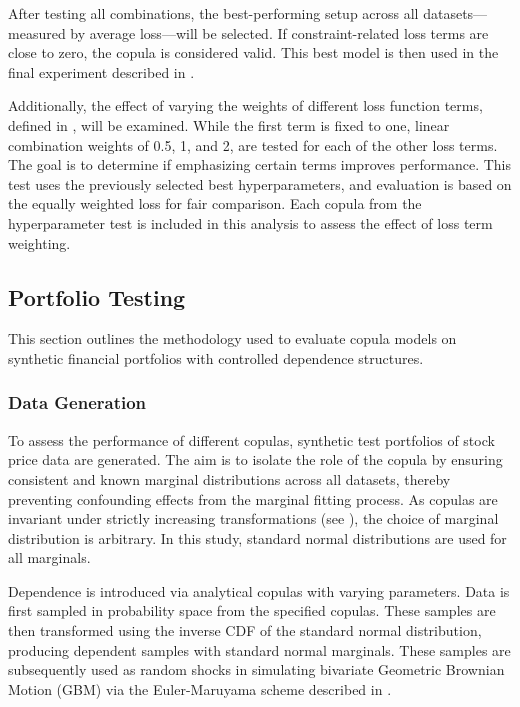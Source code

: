 
After testing all combinations, the best-performing setup across all datasets—measured by average loss—will be selected. If constraint-related loss terms are close to zero, the copula is considered valid. This best model is then used in the final experiment described in .

Additionally, the effect of varying the weights of different loss function terms, defined in , will be examined. While the first term is fixed to one, linear combination weights of 0.5, 1, and 2, are tested for each of the other loss terms. The goal is to determine if emphasizing certain terms improves performance. This test uses the previously selected best hyperparameters, and evaluation is based on the equally weighted loss for fair comparison. Each copula from the hyperparameter test is included in this analysis to assess the effect of loss term weighting.


\subsection{Portfolio Testing}\label{sec:PortfolioTesting}
This section outlines the methodology used to evaluate copula models on synthetic financial portfolios with controlled dependence structures.

\subsubsection{Data Generation}
To assess the performance of different copulas, synthetic test portfolios of stock price data are generated. The aim is to isolate the role of the copula by ensuring consistent and known marginal distributions across all datasets, thereby preventing confounding effects from the marginal fitting process. As copulas are invariant under strictly increasing transformations (see ), the choice of marginal distribution is arbitrary. In this study, standard normal distributions are used for all marginals.

Dependence is introduced via analytical copulas with varying parameters. Data is first sampled in probability space from the specified copulas. These samples are then transformed using the inverse CDF of the standard normal distribution, producing dependent samples with standard normal marginals. These samples are subsequently used as random shocks in simulating bivariate Geometric Brownian Motion (GBM) via the Euler-Maruyama scheme described in .

